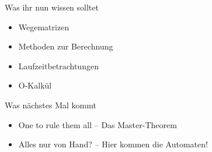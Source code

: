 




\begin{frame}	
	\begin{block}{Was ihr nun wissen solltet}
		\begin{itemize}
			\item Wegematrizen
			\item Methoden zur Berechnung
			\item Laufzeitbetrachtungen
			\item O-Kalkül
		\end{itemize}
	\end{block}
	
	\begin{block}{Was nächstes Mal kommt}
		\begin{itemize}
			\item One to rule them all -- Das Master-Theorem
			\item Alles nur von Hand? -- Hier kommen die Automaten!
		\end{itemize}
	\end{block}
\end{frame}


\slideThanks

